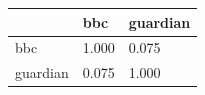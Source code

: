 \begin{tabular}{lll}
\toprule
 & bbc & guardian \\
\midrule
bbc & 1.000 & 0.075 \\
guardian & 0.075 & 1.000 \\
\bottomrule
\end{tabular}
